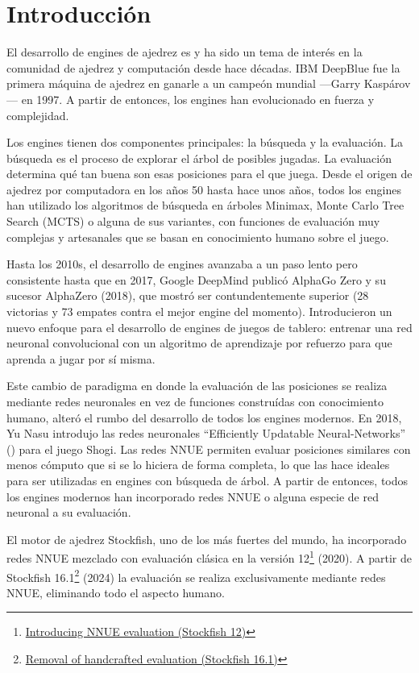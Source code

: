 \section*{Introducción}

El desarrollo de engines de ajedrez es y ha sido un tema de interés en la comunidad de ajedrez y computación desde hace décadas. IBM DeepBlue \cite{deepblue:2002} fue la primera máquina de ajedrez en ganarle a un campeón mundial ---Garry Kaspárov--- en 1997. A partir de entonces, los engines han evolucionado en fuerza y complejidad.

Los engines tienen dos componentes principales: la búsqueda y la evaluación. La búsqueda es el proceso de explorar el árbol de posibles jugadas. La evaluación determina qué tan buena son esas posiciones para el que juega. Desde el origen de ajedrez por computadora en los años 50 hasta hace unos años, todos los engines han utilizado los algoritmos de búsqueda en árboles Minimax, Monte Carlo Tree Search \cite{mcts-survey:2012} (MCTS) o alguna de sus variantes, con funciones de evaluación muy complejas y artesanales que se basan en conocimiento humano sobre el juego.

Hasta los 2010s, el desarrollo de engines avanzaba a un paso lento pero consistente hasta que en 2017, Google DeepMind publicó AlphaGo Zero \cite{alphagozero:2017} y su sucesor AlphaZero \cite{alphazero:2017,alphazero:2018} (2018), que mostró ser contundentemente superior (28 victorias y 73 empates contra el mejor engine del momento). Introducieron un nuevo enfoque para el desarrollo de engines de juegos de tablero: entrenar una red neuronal convolucional con un algoritmo de aprendizaje por refuerzo para que aprenda a jugar por sí misma.

Este cambio de paradigma en donde la evaluación de las posiciones se realiza mediante redes neuronales en vez de funciones construídas con conocimiento humano, alteró el rumbo del desarrollo de todos los engines modernos. En 2018, Yu Nasu introdujo las redes neuronales ``Efficiently Updatable Neural-Networks''  \cite{nnue:2018} () para el juego Shogi. Las redes NNUE permiten evaluar posiciones similares con menos cómputo que si se lo hiciera de forma completa, lo que las hace ideales para ser utilizadas en engines con búsqueda de árbol. A partir de entonces, todos los engines modernos han incorporado redes NNUE o alguna especie de red neuronal a su evaluación.

El motor de ajedrez Stockfish, uno de los más fuertes del mundo, ha incorporado redes NNUE mezclado con evaluación clásica en la versión 12\footnote[1]{\href{https://stockfishchess.org/blog/2020/introducing-nnue-evaluation/}{Introducing NNUE evaluation (Stockfish 12)}} (2020). A partir de Stockfish 16.1\footnote[2]{\href{https://stockfishchess.org/blog/2024/stockfish-16-1/}{Removal of handcrafted evaluation (Stockfish 16.1)}} (2024) la evaluación se realiza exclusivamente mediante redes NNUE, eliminando todo el aspecto humano.

